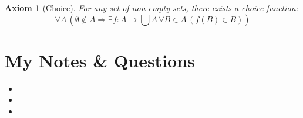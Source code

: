 \documentclass[12pt, a4paper]{article}
\newtheorem{axiom}{Axiom}[section]
\begin{document}
\begin{axiom}[Choice]
For any set of non-empty sets, there exists a choice function:
$$\forall A \, (\emptyset \notin A \Rightarrow \exists f : A \to \bigcup A \, \forall B \in A \, (f(B) \in B))$$
\end{axiom}

\section{My Notes \& Questions}


\begin{itemize}
    \item 
    \item 
    \item 
\end{itemize}
\end{document}
